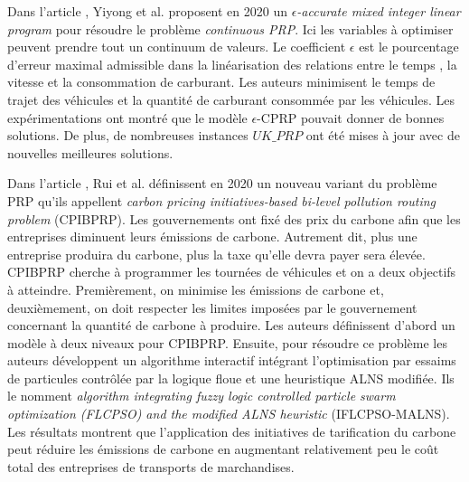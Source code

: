 Dans l'article \cite{PRP_Yiyong_2020}, Yiyong et al. proposent en 2020 un \textit{$\epsilon$-accurate mixed integer linear program} pour résoudre le problème \textit{continuous PRP}. Ici les variables à optimiser peuvent prendre tout un continuum de valeurs. Le coefficient $\epsilon$ est le pourcentage d'erreur maximal admissible dans la linéarisation des relations entre le temps , la vitesse et la consommation de carburant. Les auteurs minimisent le temps de trajet des véhicules et la quantité de carburant consommée par les véhicules. Les expérimentations ont montré que le modèle $\epsilon$-CPRP pouvait donner de bonnes solutions.%
  De plus, de nombreuses instances $UK\_PRP$ ont été mises à jour avec de nouvelles meilleures solutions.


 Dans l'article \cite{PRP_Rui_2020}, Rui et al. définissent en 2020 un nouveau variant du problème PRP qu'ils appellent \textit{carbon pricing initiatives-based bi-level pollution routing problem} (CPIBPRP). Les gouvernements ont fixé des prix du carbone afin que les entreprises diminuent leurs émissions de carbone. Autrement dit, plus une entreprise produira du carbone, plus la taxe qu'elle devra payer sera élevée. CPIBPRP cherche à programmer les tournées de véhicules et on a deux objectifs à atteindre. Premièrement, on minimise les émissions de carbone et, deuxièmement, on doit respecter les limites imposées par le gouvernement concernant la quantité de carbone à produire. Les auteurs définissent d'abord un modèle à deux niveaux pour CPIBPRP. Ensuite, pour résoudre ce problème les auteurs développent un algorithme interactif intégrant l'optimisation par essaims de particules contrôlée par la logique floue et une heuristique ALNS modifiée. Ils le nomment \textit{algorithm integrating fuzzy logic controlled particle swarm optimization (FLCPSO) and the modified ALNS heuristic} (IFLCPSO-MALNS). Les résultats montrent que l'application des initiatives de tarification du carbone peut réduire les émissions de carbone en augmentant relativement peu le coût total des entreprises de transports de marchandises.


